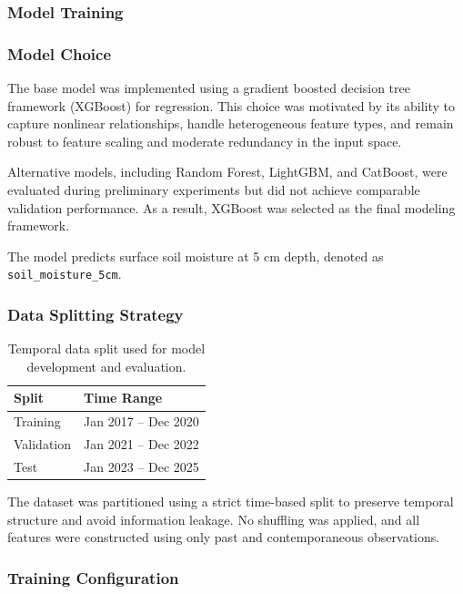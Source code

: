 \subsubsection*{Model Training}

\subsubsection*{Model Choice}
The base model was implemented using a gradient boosted decision tree framework (XGBoost) for regression. This choice was motivated by its ability to capture nonlinear relationships, handle heterogeneous feature types, and remain robust to feature scaling and moderate redundancy in the input space.

Alternative models, including Random Forest, LightGBM, and CatBoost, were evaluated during preliminary experiments but did not achieve comparable validation performance. As a result, XGBoost was selected as the final modeling framework.

The model predicts surface soil moisture at 5 cm depth, denoted as \texttt{soil\_moisture\_5cm}.

\subsubsection*{Data Splitting Strategy}

\begin{table}[H]
\centering
\begin{tabular}{ll}
\toprule
\textbf{Split} & \textbf{Time Range} \\
\midrule
Training & Jan 2017 -- Dec 2020 \\
Validation & Jan 2021 -- Dec 2022 \\
Test & Jan 2023 -- Dec 2025 \\
\bottomrule
\end{tabular}
\caption{Temporal data split used for model development and evaluation.}
\end{table}

The dataset was partitioned using a strict time-based split to preserve temporal structure and avoid information leakage. No shuffling was applied, and all features were constructed using only past and contemporaneous observations.

\subsubsection*{Training Configuration}

